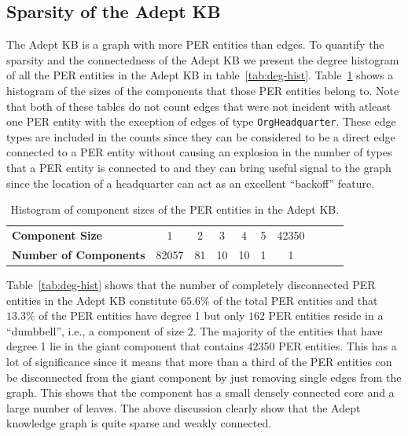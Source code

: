 \documentclass[paper=a4,fontsize=11pt]{scrartcl}
\newcommand{\ie}{i.e.,\xspace}
\newcommand{\tabref}[1]{table~\ref{#1}}
\newcommand{\Tabref}[1]{Table~\ref{#1}}
\numberwithin{equation}{section}    %
\numberwithin{figure}{section}      %
\numberwithin{table}{section}       %
\begin{document}
\subsection{Sparsity of the Adept KB}
\label{sec:graph-sparsity}
The Adept KB is a graph with more \textsc{PER} entities than edges.
To quantify the sparsity and the connectedness of the Adept KB we present
the degree histogram of all the \textsc{PER} entities in the Adept KB in \tabref{tab:deg-hist}. \Tabref{tab:hist-comp} shows a histogram of the sizes of the components that those \textsc{PER} entities belong to.
Note that both of these tables do not count edges that were not incident
with atleast one \textsc{PER} entity with the exception of edges of type
\texttt{OrgHeadquarter}. These edge types are included in the counts since they can
be considered to be a direct edge connected to a \textsc{PER} entity without causing
an explosion in the number of types that a \textsc{PER} entity is connected to
and they can bring useful signal to the graph since the location of a headquarter
can act as an excellent ``backoff'' feature.
\begin{table}[htbp]
  \centering
  \caption{Degree histogram for the \textsc{PER} entities in the Adept KB.}
  \label{tab:deg-hist}
\end{table}

\begin{table}[htbp]
  \centering
  \begin{tabular}{l | c c c c c c c c c }
    \textbf{Component Size}     & 1     & 2  & 3  & 4  & 5 & 42350 \\
  \textbf{Number of Components} & 82057 & 81 & 10 & 10 & 1 & 1     \\
  \end{tabular}
  \caption{Histogram of component sizes of the \textsc{PER} entities in the Adept KB.}
  \label{tab:hist-comp}
\end{table}

\Tabref{tab:deg-hist} shows that the number of
completely disconnected \textsc{PER} entities in the Adept KB constitute $65.6\%$
of the total \textsc{PER} entities and that $13.3\%$ of the \textsc{PER}
entities have degree 1 but only $162$ \textsc{PER} entities reside in a ``dumbbell'', \ie a component of size $2$. The majority of the entities that have degree 1 lie in the
giant component that contains $42350$ \textsc{PER} entities. This has a lot of significance since it means that more than a third of the \textsc{PER} entities con be disconnected from the giant component by just removing single edges from the graph. This shows
that the component has a small densely connected core and a large number of leaves.
The above discussion clearly show that the Adept knowledge graph is quite sparse
and weakly connected.
\end{document}
